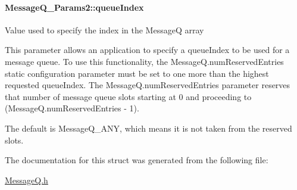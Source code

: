 \paragraph[{queue\-Index}]{ Message\-Q\-\_\-\-Params2\-::queue\-Index}\label{struct_message_q___params2_a17e609ce59bab5020ae5d180a3df0130}
Value used to specify the index in the Message\-Q array \begin{DoxyVerb}    This parameter allows an application to specify a queueIndex to
    be used for a message queue. To use this functionality, the
    MessageQ.numReservedEntries static configuration parameter must be
    set to one more than the highest requested queueIndex. The
    MessageQ.numReservedEntries parameter reserves that number of
    message queue slots starting at 0 and proceeding to
    (MessageQ.numReservedEntries - 1).

    The default is MessageQ_ANY, which means it is not taken from the
    reserved slots.\end{DoxyVerb}
 

The documentation for this struct was generated from the following file\-:\begin{DoxyCompactItemize}
\item 
\hyperlink{_message_q_8h}{Message\-Q.\-h}\end{DoxyCompactItemize}
